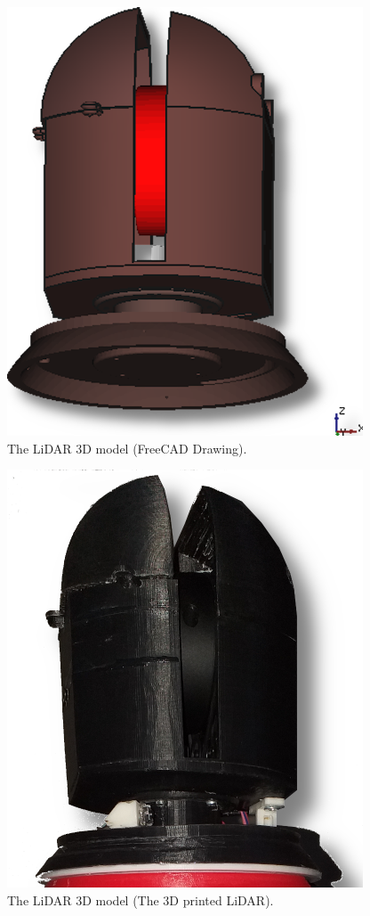 \documentclass[Afour,sageh,times]{sagej}
\begin{document}
\begin{figure}
    \centering
    \includegraphics[scale=15]{lidar3d.png}
    \caption{The LiDAR 3D model (FreeCAD Drawing).}
    \label{fig:LiDAR3D}
\end{figure}
\begin{figure}
    \centering
    \includegraphics[scale=15]{lidar3dprntd.png}
    \caption{The LiDAR 3D model (The 3D printed LiDAR).}
    \label{fig:3DprintedLiDAR}
\end{figure}
\end{document}
